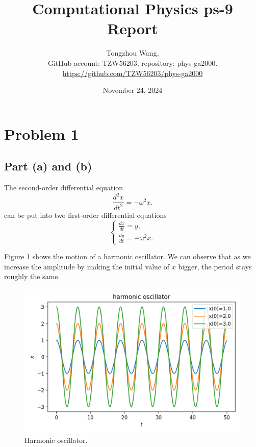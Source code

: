 \documentclass[11pt]{article}
\title{Computational Physics ps-9 Report}
\author{Tongzhou Wang, \\ GitHub account: TZW56203, repository: phys-ga2000. \\ \url{https://github.com/TZW56203/phys-ga2000}}
\date{November 24, 2024}
\begin{document}
\maketitle

\section{Problem 1}

\subsection{Part (a) and (b)}
The second-order differential equation
\begin{equation}
    \frac{d^2 x}{dt^2} = -\omega^2 x.
\end{equation}
can be put into two first-order differential equations
\begin{equation}
    \begin{cases}
        \frac{dx}{dt} = y, \\
        \frac{dy}{dt} = -\omega^2 x.
    \end{cases}
\end{equation}

Figure \ref{fig:harmonic} shows the motion of a harmonic oscillator. We can observe that as we increase the amplitude by making the initial value of $x$ bigger, the period stays roughly the same.
\begin{figure}[H]
    \centering
    \includegraphics[scale = 0.7]{Figs/ps-9-1ab.png}
    \caption{Harmonic oscillator.}
    \label{fig:harmonic}
\end{figure}
\end{document}
